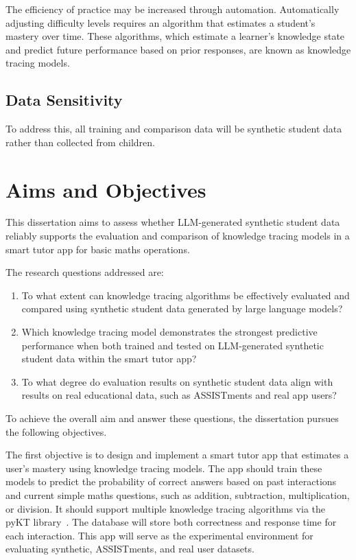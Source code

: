 The efficiency of practice may be increased through automation. Automatically adjusting difficulty levels requires an algorithm that estimates a student's mastery over time. These algorithms, which estimate a learner's knowledge state and predict future performance based on prior responses, are known as knowledge tracing models.

\subsection{Data Sensitivity}

To address this, all training and comparison data will be synthetic student data rather than collected from children.

\section{Aims and Objectives}

This dissertation aims to assess whether LLM-generated synthetic student data reliably supports the evaluation and comparison of knowledge tracing models in a smart tutor app for basic maths operations.

The research questions addressed are:

\begin{enumerate}
    \item To what extent can knowledge tracing algorithms be effectively evaluated and compared using synthetic student data generated by large language models?
    \item Which knowledge tracing model demonstrates the strongest predictive performance when both trained and tested on LLM-generated synthetic student data within the smart tutor app?
    \item To what degree do evaluation results on synthetic student data align with results on real educational data, such as ASSISTments and real app users?
\end{enumerate}

To achieve the overall aim and answer these questions, the dissertation pursues the following objectives.

The first objective is to design and implement a smart tutor app that estimates a user's mastery using knowledge tracing models. The app should train these models to predict the probability of correct answers based on past interactions and current simple maths questions, such as addition, subtraction, multiplication, or division. It should support multiple knowledge tracing algorithms via the pyKT library~\autocite{pyktPaper}. The database will store both correctness and response time for each interaction. This app will serve as the experimental environment for evaluating synthetic, ASSISTments, and real user datasets.

